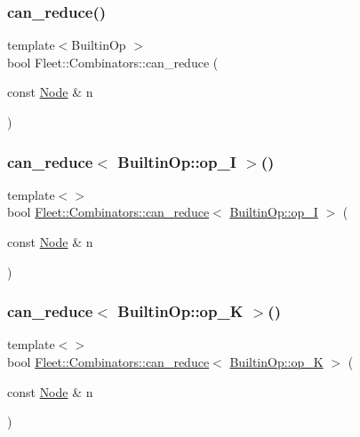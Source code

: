 \subsubsection{\texorpdfstring{can\+\_\+reduce()}{can\_reduce()}}
{\footnotesize\ttfamily template$<$Builtin\+Op $>$ \\
bool Fleet\+::\+Combinators\+::can\+\_\+reduce (\begin{DoxyParamCaption}\item[{const \hyperlink{class_node}{Node} \&}]{n }\end{DoxyParamCaption})}

\mbox{\label{namespace_fleet_1_1_combinators_a8bef003899607e07e72709b799187195}} 
\subsubsection{\texorpdfstring{can\+\_\+reduce$<$ Builtin\+Op\+::op\+\_\+\+I $>$()}{can\_reduce< BuiltinOp::op\_I >()}}
{\footnotesize\ttfamily template$<$$>$ \\
bool \hyperlink{namespace_fleet_1_1_combinators_a3d456e1f1eeb0569b962e4ddb521c64a}{Fleet\+::\+Combinators\+::can\+\_\+reduce}$<$ \hyperlink{_instruction_8h_af2fb7c87c5854c5733d7bb0506b06de7ad44d28cb2a17778a81beb232dd72759a}{Builtin\+Op\+::op\+\_\+I} $>$ (\begin{DoxyParamCaption}\item[{const \hyperlink{class_node}{Node} \&}]{n }\end{DoxyParamCaption})}

\mbox{\label{namespace_fleet_1_1_combinators_a0dd08c4539c98c52ea031ecf364bcb60}} 
\subsubsection{\texorpdfstring{can\+\_\+reduce$<$ Builtin\+Op\+::op\+\_\+\+K $>$()}{can\_reduce< BuiltinOp::op\_K >()}}
{\footnotesize\ttfamily template$<$$>$ \\
bool \hyperlink{namespace_fleet_1_1_combinators_a3d456e1f1eeb0569b962e4ddb521c64a}{Fleet\+::\+Combinators\+::can\+\_\+reduce}$<$ \hyperlink{_instruction_8h_af2fb7c87c5854c5733d7bb0506b06de7a2fb436da7a3a42d51ead8de1ff97583b}{Builtin\+Op\+::op\+\_\+K} $>$ (\begin{DoxyParamCaption}\item[{const \hyperlink{class_node}{Node} \&}]{n }\end{DoxyParamCaption})}

